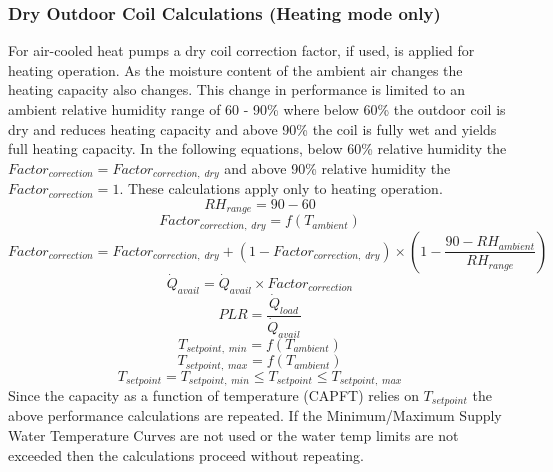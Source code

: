 \subsubsection{Dry Outdoor Coil Calculations (Heating mode only)}\label{eir-air-to-water-heat-pumps-dry-coil-calculations}
For air-cooled heat pumps a dry coil correction factor, if used, is applied for heating operation. As the moisture content of the ambient air changes the heating capacity also changes. This change in performance is limited to an ambient relative humidity range of 60 - 90\% where below 60\% the outdoor coil is dry and reduces heating capacity and above 90\% the coil is fully wet and yields full heating capacity. In the following equations, below 60\% relative humidity the $Factor_{correction} = Factor_{correction,\;dry}$ and above 90\% relative humidity the $Factor_{correction} = 1$. These calculations apply only to heating operation.
\begin{equation}
RH_{range} = 90 - 60
\end{equation}
\begin{equation}
Factor_{correction,\;dry} = f(T_{ambient})
\end{equation}
\begin{equation}
Factor_{correction} = Factor_{correction,\;dry} + (1 - Factor_{correction,\;dry}) \times (1 - \frac{90 - RH_{ambient}}{RH_{range}})
\end{equation}
\begin{equation}
\dot{Q}_{avail} = \dot{Q}_{avail} \times Factor_{correction}
\end{equation}
\begin{equation}
PLR = \frac{\dot{Q}_{load}}{\dot{Q}_{avail}}
\end{equation}
\begin{equation}
T_{setpoint,\;min} = f(T_{ambient})
\end{equation}
\begin{equation}
T_{setpoint,\;max} = f(T_{ambient})
\end{equation}
\begin{equation}
T_{setpoint} = T_{setpoint,\;min} \le T_{setpoint} \le T_{setpoint,\;max}
\end{equation}
Since the capacity as a function of temperature (CAPFT) relies on $T_{setpoint}$ the above performance calculations are repeated. If the Minimum/Maximum Supply Water Temperature Curves are not used or the water temp limits are not exceeded then the calculations proceed without repeating.

